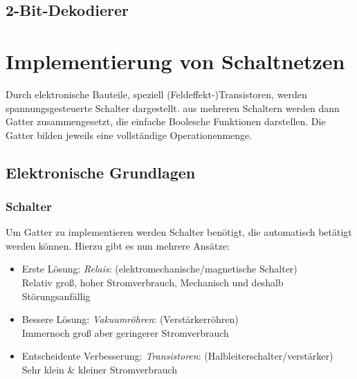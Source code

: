 \documentclass[12pt]{report}
\begin{document}
\subsection{2-Bit-Dekodierer}



\section{Implementierung von Schaltnetzen}
\begin{defbox}
  Durch elektronische Bauteile, speziell (Feldeffekt-)Transistoren, werden spannungsgesteuerte Schalter dargestellt.
  aus mehreren Schaltern werden dann Gatter zusammengesetzt, die einfache Boolesche Funktionen darstellen.
  Die Gatter bilden jeweils eine vollständige Operationenmenge.
\end{defbox}

\subsection{Elektronische Grundlagen}
\subsubsection{Schalter}
Um Gatter zu implementieren werden Schalter benötigt, die automatisch betätigt werden können. Hierzu gibt es nun mehrere Ansätze:
\begin{itemize}
  \item Erste Lösung: \textit{Relais}: (elektromechanische/magnetische
        Schalter)\\
        Relativ groß, hoher Stromverbrauch, Mechanisch und deshalb Störungsanfällig

  \item Bessere Lösung: \textit{Vakuumröhren}: (Verstärkerröhren) \\
        Immernoch groß aber geringerer Stromverbrauch

  \item Entscheidente Verbesserung: \textit{Transistoren}: (Halbleiterschalter/verstärker) \\
        Sehr klein \& kleiner Stromverbrauch

\end{itemize}
\end{document}
